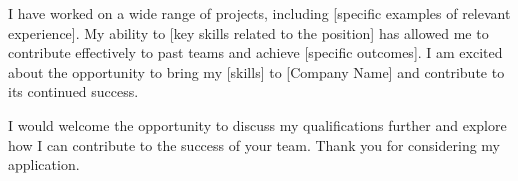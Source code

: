 \documentclass[11pt,a4paper,sans]{moderncv}        %
\begin{document}
I have worked on a wide range of projects, including [specific examples of relevant experience]. 
My ability to [key skills related to the position] has allowed me to contribute effectively to past teams and achieve [specific outcomes]. 
I am excited about the opportunity to bring my [skills] to [Company Name] and contribute to its continued success.

I would welcome the opportunity to discuss my qualifications further and explore how I can contribute to the success of your team. Thank you for considering my application.

\makeletterclosing
\end{document}
